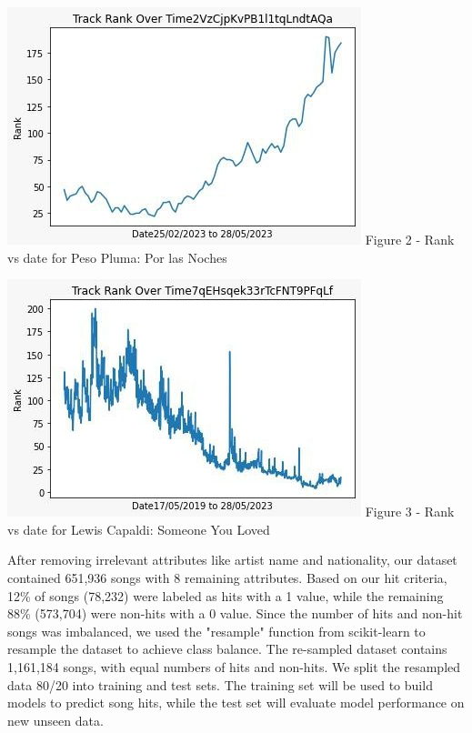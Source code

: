 \documentclass{article}
\begin{document}
\begin{center}
  \centering
  \begin{minipage}{0.45\textwidth}
    \centering
    \includegraphics[width=\linewidth]{1.jpg}
    \footnotesize{Figure 2 - Rank vs date for Peso Pluma: Por las Noches}
  \end{minipage}\hfill
  \begin{minipage}{0.45\textwidth}
    \centering
    \includegraphics[width=\linewidth]{2.jpg}
    \footnotesize{Figure 3 - Rank vs date for Lewis Capaldi: Someone You Loved}
  \end{minipage}
\end{center}

After removing irrelevant attributes like artist name and nationality, our dataset contained 651,936 songs with 8 remaining attributes. Based on our hit criteria, 12\% of songs (78,232) were labeled as hits with a 1 value, while the remaining 88\% (573,704) were non-hits with a 0 value. Since the number of hits and non-hit songs was imbalanced, we used the "resample" function from scikit-learn to resample the dataset to achieve class balance. The re-sampled dataset contains 1,161,184 songs, with equal numbers of hits and non-hits. We split the resampled data 80/20 into training and test sets. The training set will be used to build models to predict song hits, while the test set will evaluate model performance on new unseen data.
\end{document}
